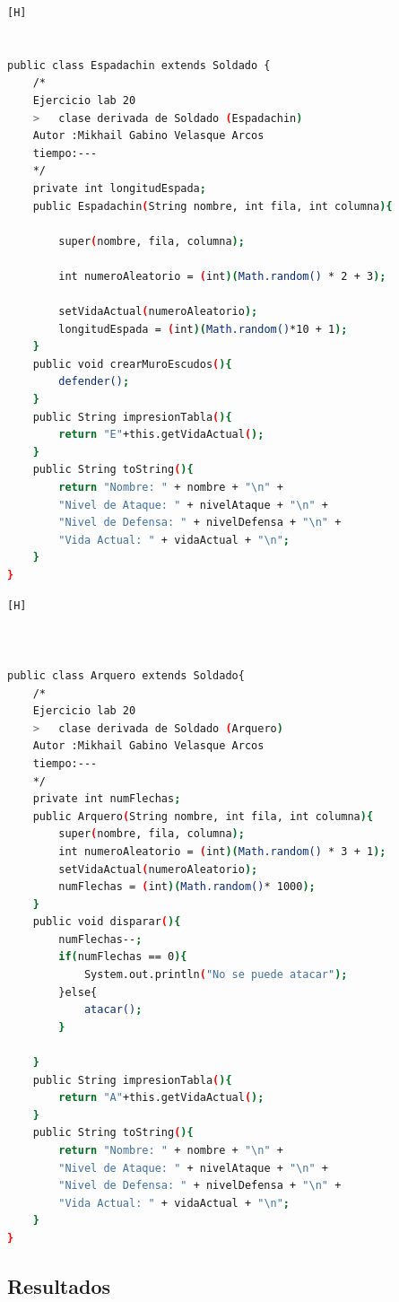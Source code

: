 \documentclass{article}
\begin{document}
	\begin{lstlisting}[language=bash,caption={CLASE Espadachin}][H]
	

public class Espadachin extends Soldado {
	/*
	Ejercicio lab 20 
	>	clase derivada de Soldado (Espadachin) 
	Autor :Mikhail Gabino Velasque Arcos
	tiempo:---
	*/
    private int longitudEspada;
    public Espadachin(String nombre, int fila, int columna){

        super(nombre, fila, columna);

        int numeroAleatorio = (int)(Math.random() * 2 + 3);

		setVidaActual(numeroAleatorio);
        longitudEspada = (int)(Math.random()*10 + 1);
    }
    public void crearMuroEscudos(){
        defender();
    }
    public String impresionTabla(){
        return "E"+this.getVidaActual();
    }
    public String toString(){
        return "Nombre: " + nombre + "\n" +
        "Nivel de Ataque: " + nivelAtaque + "\n" +
        "Nivel de Defensa: " + nivelDefensa + "\n" +
        "Vida Actual: " + vidaActual + "\n";
    }
}
	\end{lstlisting}	
	
	\begin{lstlisting}[language=bash,caption={CLASE Arquero}][H]
	


public class Arquero extends Soldado{
	/*
	Ejercicio lab 20 
	>	clase derivada de Soldado (Arquero) 
	Autor :Mikhail Gabino Velasque Arcos
	tiempo:---
	*/
    private int numFlechas;
    public Arquero(String nombre, int fila, int columna){
        super(nombre, fila, columna);
        int numeroAleatorio = (int)(Math.random() * 3 + 1);
		setVidaActual(numeroAleatorio);
        numFlechas = (int)(Math.random()* 1000);
    }
    public void disparar(){
        numFlechas--;
        if(numFlechas == 0){
            System.out.println("No se puede atacar");
        }else{
            atacar();
        }
        
    }
    public String impresionTabla(){
        return "A"+this.getVidaActual();
    }
    public String toString(){
        return "Nombre: " + nombre + "\n" +
        "Nivel de Ataque: " + nivelAtaque + "\n" +
        "Nivel de Defensa: " + nivelDefensa + "\n" +
        "Vida Actual: " + vidaActual + "\n";
    }
}
	\end{lstlisting}	
		
		
	
	
	\subsection{Resultados}
	
\end{document}
